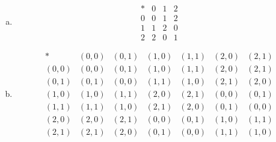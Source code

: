 \begin{solution}
	\begin{enumerate}[(a)]
		\item
		\[
		\begin{array}{c|ccc}
			* & 0 & 1 & 2  \\
			\hline
			0 & 0 & 1 & 2 \\
			1 & 1 & 2 & 0 \\
			2 & 2 & 0 & 1 
		\end{array}
		\]
		\item 
		\[ \begin{array}{c|cccccc}
			*     & (0,0) & (0,1) & (1,0) & (1,1) & (2,0) & (2,1) \\
			\hline
			(0,0) & (0,0) & (0,1) & (1,0) & (1,1) & (2,0) & (2,1) \\
			(0,1) & (0,1) & (0,0) & (1,1) & (1,0) & (2,1) & (2,0) \\
			(1,0) & (1,0) & (1,1) & (2,0) & (2,1) & (0,0) & (0,1) \\
			(1,1) & (1,1) & (1,0) & (2,1) & (2,0) & (0,1) & (0,0) \\ 
			(2,0) & (2,0) & (2,1) & (0,0) & (0,1) & (1,0) & (1,1) \\
			(2,1) & (2,1) & (2,0) & (0,1) & (0,0) & (1,1) & (1,0)
		\end{array} \]
	\end{enumerate}
\end{solution}

